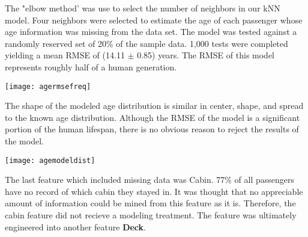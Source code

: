 \documentclass[10pt]{article}
\begin{document}
\begin{multicols}{2}
	The "elbow method' was use to select the number of neighbors in our kNN model.
	Four neighbors were selected to estimate the age of each passenger whose age information was missing from the data set.
	The model was tested against a randomly reserved set of 20\% of the sample data.
	1,000 tests were completed yielding a mean RMSE of (14.11 $\pm$ 0.85) years.
	The RMSE of this model represents roughly half of a human generation.
	\begin{center}
	\texttt{[image: agermsefreq]}\\
	\end{center}

	The shape of the modeled age distribution is similar in center, shape, and spread to the known age distribution.
	Although the RMSE of the model is a significant portion of the human lifespan, there is no obvious reason to reject the results of the model.
	\begin{center}
	\texttt{[image: agemodeldist]}\\
	\end{center}

	The last feature which included missing data was Cabin.
	77\% of all passengers have no record of which cabin they stayed in.
	It was thought that no appreciable amount of information could be mined from this feature as it is.
	Therefore, the cabin feature did not recieve a modeling treatment.
	The feature was ultimately engineered into another feature \textbf{Deck}.


\end{multicols}
\end{document}
